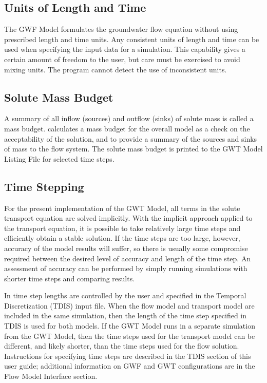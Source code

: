 \subsection{Units of Length and Time}
The GWF Model formulates the groundwater flow equation without using prescribed length and time units. Any consistent units of length and time can be used when specifying the input data for a simulation. This capability gives a certain amount of freedom to the user, but care must be exercised to avoid mixing units.  The program cannot detect the use of inconsistent units.

\subsection{Solute Mass Budget}
A summary of all inflow (sources) and outflow (sinks) of solute mass is called a mass budget.  \mf calculates a mass budget for the overall model as a check on the acceptability of the solution, and to provide a summary of the sources and sinks of mass to the flow system.  The solute mass budget is printed to the GWT Model Listing File for selected time steps.

\subsection{Time Stepping}

For the present implementation of the GWT Model, all terms in the solute transport equation are solved implicitly.  With the implicit approach applied to the transport equation, it is possible to take relatively large time steps and efficiently obtain a stable solution.  If the time steps are too large, however, accuracy of the model results will suffer, so there is usually some compromise required between the desired level of accuracy and length of the time step.  An assessment of accuracy can be performed by simply running simulations with shorter time steps and comparing results.

In \mf time step lengths are controlled by the user and specified in the Temporal Discretization (TDIS) input file.  When the flow model and transport model are included in the same simulation, then the length of the time step specified in TDIS is used for both models.  If the GWT Model runs in a separate simulation from the GWT Model, then the time steps used for the transport model can be different, and likely shorter, than the time steps used for the flow solution.  Instructions for specifying time steps are described in the TDIS section of this user guide; additional information on GWF and GWT configurations are in the Flow Model Interface section.  



